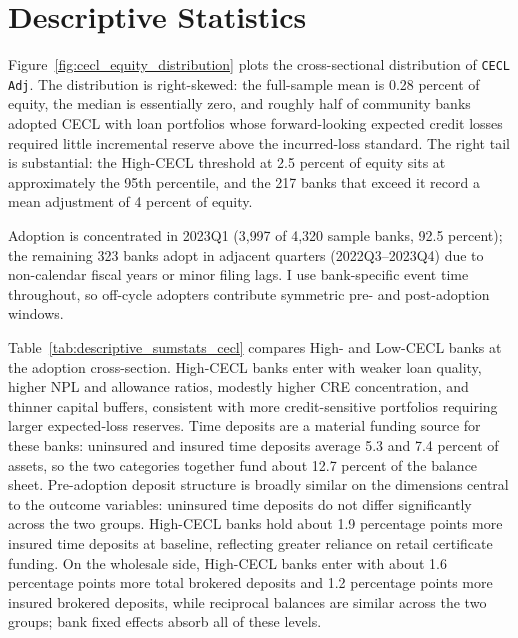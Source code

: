 \section{Descriptive Statistics}
\label{sec:descriptive}

Figure~\ref{fig:cecl_equity_distribution} plots the cross-sectional
distribution of \texttt{CECL Adj}.  The distribution is right-skewed:
the full-sample mean is 0.28 percent of equity, the median is
essentially zero, and roughly half of community banks adopted CECL with
loan portfolios whose forward-looking expected credit losses required
little incremental reserve above the incurred-loss standard.  The right
tail is substantial: the High-CECL threshold at 2.5 percent of equity
sits at approximately the 95th percentile, and the 217 banks that
exceed it record a mean adjustment of 4 percent of equity.

Adoption is concentrated in 2023Q1 (3,997 of 4,320 sample banks, 92.5
percent); the remaining 323 banks adopt in adjacent quarters
(2022Q3--2023Q4) due to non-calendar fiscal years or minor filing lags.
I use bank-specific event time throughout, so off-cycle adopters
contribute symmetric pre- and post-adoption windows.

Table~\ref{tab:descriptive_sumstats_cecl} compares High- and Low-CECL
banks at the adoption cross-section.  High-CECL banks enter with weaker
loan quality, higher NPL and allowance ratios, modestly higher CRE
concentration, and thinner capital buffers, consistent with more
credit-sensitive portfolios requiring larger expected-loss reserves.
Time deposits are a material funding source for these banks: uninsured
and insured time deposits average 5.3 and 7.4 percent of assets, so
the two categories together fund about 12.7 percent of the balance
sheet.  Pre-adoption deposit structure is broadly similar on the
dimensions central to the outcome variables: uninsured time deposits do
not differ significantly across the two groups.  High-CECL banks hold
about 1.9 percentage points more insured time deposits at baseline,
reflecting greater reliance on retail certificate funding.  On the
wholesale side, High-CECL banks enter with about 1.6 percentage points
more total brokered deposits and 1.2 percentage points more insured
brokered deposits, while reciprocal balances are similar across the
two groups; bank fixed effects absorb all of these levels.
